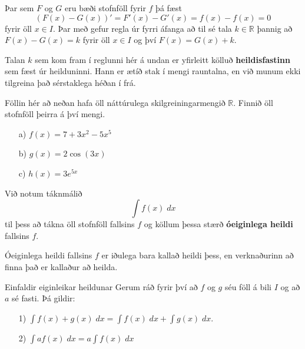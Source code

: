 \begin{sonnun}
Þar sem $F$ og $G$ eru bæði stofnföll fyrir $f$ þá fæst 
$$
\left(F(x)-G(x)\right)' = F'(x)-G'(x) = f(x)-f(x) = 0
$$
fyrir öll $x \in I$. Þar með gefur regla úr fyrri áfanga að til sé tala $k \in \mathbb{R}$ þannig að $F(x) - G(x) = k$ fyrir öll $x \in I$ og því $F(x) = G(x) + k$.
\end{sonnun}

\begin{ath}
Talan $k$ sem kom fram í reglunni hér á undan er yfirleitt kölluð \textbf{heildisfastinn} sem fæst úr heilduninni. Hann er ætíð stak í mengi rauntalna, en við munum ekki tilgreina það sérstaklega héðan í frá.
\end{ath}

\begin{æd}
Föllin hér að neðan hafa öll náttúrulega skilgreiningarmengið $\mathbb{R}$. Finnið öll stofnföll þeirra á því mengi.
\begin{itemize}
\item[a)] $f(x) = 7+3x^2-5x^5$

\item[b)] $g(x) = 2\cos(3x)$

\item[c)] $h(x) = 3e^{5x}$
\end{itemize}
\end{æd}

\begin{skilgr}{}
Við notum táknmálið
$$
\int f(x)\;dx
$$
til þess að tákna öll stofnföll fallsins $f$ og köllum þessa stærð \textbf{óeiginlega heildi} fallsins $f$.
\end{skilgr}

\begin{ath}
Óeiginlega heildi fallsins $f$ er iðulega bara kallað heildi þess, en verknaðurinn að finna það er kallaður að heilda.
\end{ath}

\begin{regla}{Einfaldir eiginleikar heildunar}
Gerum ráð fyrir því að $f$ og $g$ séu föll á bili $I$ og að $a$ sé fasti. Þá gildir:
\begin{itemize}
\item[1)] $\displaystyle \int f(x)+g(x)\; dx = \int f(x) \; dx + \int g(x) \; dx$.

\item[2)] $\displaystyle \int af(x)\; dx = a\int f(x) \; dx$
\end{itemize}
\end{regla}

